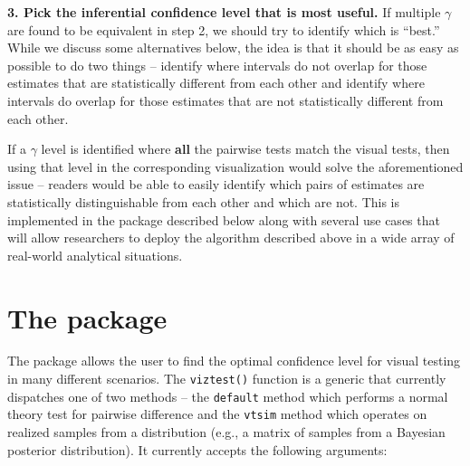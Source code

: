 \textbf{3. Pick the inferential confidence level that is most useful.} If multiple \(\gamma\) are found to be equivalent in step 2, we should try to identify which is ``best.'' While we discuss some alternatives below, the idea is that it should be as easy as possible to do two things -- identify where intervals do not overlap for those estimates that are statistically different from each other and identify where intervals do overlap for those estimates that are not statistically different from each other.

If a \(\gamma\) level is identified where \textbf{all} the pairwise tests match the visual tests, then using that level in the corresponding visualization would solve the aforementioned issue -- readers would be able to easily identify which pairs of estimates are statistically distinguishable from each other and which are not. This is implemented in the  package described below along with several use cases that will allow researchers to deploy the algorithm described above in a wide array of real-world analytical situations.

\section{\texorpdfstring{The  package}{The  package}}\label{the-package}

The  package allows the user to find the optimal confidence level for visual testing in many different scenarios. The \texttt{viztest()} function is a generic that currently dispatches one of two methods -- the \texttt{default} method which performs a normal theory test for pairwise difference and the \texttt{vtsim} method which operates on realized samples from a distribution (e.g., a matrix of samples from a Bayesian posterior distribution). It currently accepts the following arguments:

